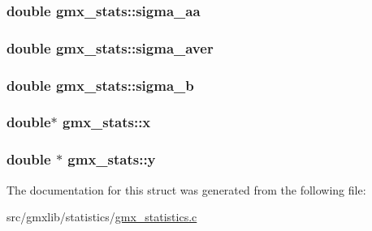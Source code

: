 \hypertarget{structgmx__stats_a1513b1e4e4369d5dce6f7fa53f16117e}{
\subsubsection[{sigma\-\_\-aa}]{\setlength{\rightskip}{0pt plus 5cm}double {\bf gmx\-\_\-stats\-::sigma\-\_\-aa}}}\label{structgmx__stats_a1513b1e4e4369d5dce6f7fa53f16117e}
\hypertarget{structgmx__stats_a57876d59817d9ca03b75f3ed4595ead4}{
\subsubsection[{sigma\-\_\-aver}]{\setlength{\rightskip}{0pt plus 5cm}double {\bf gmx\-\_\-stats\-::sigma\-\_\-aver}}}\label{structgmx__stats_a57876d59817d9ca03b75f3ed4595ead4}
\hypertarget{structgmx__stats_a919f6f0eb277a1a9ee89faedde4c765d}{
\subsubsection[{sigma\-\_\-b}]{\setlength{\rightskip}{0pt plus 5cm}double {\bf gmx\-\_\-stats\-::sigma\-\_\-b}}}\label{structgmx__stats_a919f6f0eb277a1a9ee89faedde4c765d}
\hypertarget{structgmx__stats_ab5b50130f3adb11acbbcc80d50a4a0a2}{
\subsubsection[{x}]{\setlength{\rightskip}{0pt plus 5cm}double$\ast$ {\bf gmx\-\_\-stats\-::x}}}\label{structgmx__stats_ab5b50130f3adb11acbbcc80d50a4a0a2}
\hypertarget{structgmx__stats_aa33fd44c6cb43dd3cd53b59a39ae8235}{
\subsubsection[{y}]{\setlength{\rightskip}{0pt plus 5cm}double $\ast$ {\bf gmx\-\_\-stats\-::y}}}\label{structgmx__stats_aa33fd44c6cb43dd3cd53b59a39ae8235}


\-The documentation for this struct was generated from the following file\-:\begin{DoxyCompactItemize}
\item 
src/gmxlib/statistics/\hyperlink{gmx__statistics_8c}{gmx\-\_\-statistics.\-c}\end{DoxyCompactItemize}

